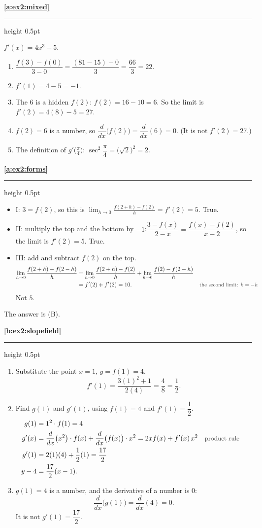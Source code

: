 \documentclass[11pt,a4paper]{article}
\newcommand{\solitem}[2]{%
 \par\addvspace{16pt}\Needspace{10\baselineskip}%
 {\large\bfseries \ref{#1}}\par\nobreak\vspace{2pt}%
 {\color{rulegray}\hrule height 0.5pt}\nobreak\vspace{7pt}%
 #2\par}
\newcommand{\why}[1]{\text{\small\color{darkgray}#1}}
\begin{document}
\solitem{a:ex2:mixed}{%
$f'(x)=4x^3-5$.
\begin{enumerate}[label=(\alph*)]
 \item $\dfrac{f(3)-f(0)}{3-0}=\dfrac{(81-15)-0}{3}=\dfrac{66}{3}=22$.
 \item $f'(1)=4-5=-1$.
 \item The $6$ is a hidden $f(2)$: $f(2)=16-10=6$. So the limit is $f'(2)=4(8)-5=27$.
 \item $f(2)=6$ is a number, so $\dfrac{d}{dx}\bigl(f(2)\bigr)=\dfrac{d}{dx}(6)=0$. (It is not $f'(2)=27$.)
 \item The definition of $g'\bigl(\frac{\pi}{4}\bigr)$: $\sec^2\dfrac{\pi}{4}=\bigl(\sqrt2\bigr)^2=2$.
\end{enumerate}
}

\solitem{a:ex2:forms}{%
\begin{itemize}
 \item I: $3=f(2)$, so this is $\displaystyle\lim_{h\to0}\frac{f(2+h)-f(2)}{h}=f'(2)=5$. True.
 \item II: multiply the top and the bottom by $-1$:\quad $\dfrac{3-f(x)}{2-x}=\dfrac{f(x)-f(2)}{x-2}$, so the limit is $f'(2)=5$. True.
 \item III: add and subtract $f(2)$ on the top.
 \begin{align*}
 \lim_{h\to0}\frac{f(2+h)-f(2-h)}{h}&=\lim_{h\to0}\frac{f(2+h)-f(2)}{h}+\lim_{h\to0}\frac{f(2)-f(2-h)}{h}\\
 &=f'(2)+f'(2)=10. &&\why{the second limit: $k=-h$}
 \end{align*}
 Not $5$.
\end{itemize}
The answer is (B).
}

\solitem{b:ex2:slopefield}{%
\begin{enumerate}[label=(\alph*)]
 \item Substitute the point $x=1$, $y=f(1)=4$.
 \[
 f'(1)=\frac{3(1)^2+1}{2(4)}=\frac48=\frac12.
 \]
 \item Find $g(1)$ and $g'(1)$, using $f(1)=4$ and $f'(1)=\dfrac12$.
 \begin{align*}
 g(1)&=1^2\cdot f(1)=4\\
 g'(x)&=\frac{d}{dx}\bigl(x^2\bigr)\cdot f(x)+\frac{d}{dx}\bigl(f(x)\bigr)\cdot x^2=2xf(x)+f'(x)\,x^2 &&\why{product rule}\\
 g'(1)&=2(1)(4)+\frac12(1)=\frac{17}{2}\\
 y-4&=\frac{17}{2}(x-1).
 \end{align*}
 \item $g(1)=4$ is a number, and the derivative of a number is $0$:
 \[
 \frac{d}{dx}\bigl(g(1)\bigr)=\frac{d}{dx}(4)=0.
 \]
 It is not $g'(1)=\dfrac{17}{2}$.
\end{enumerate}
}
\end{document}
